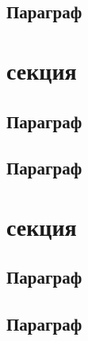 \documentclass[11pt,a4paper]{memoir}
\begin{document}
            \subsection{Параграф}

        \section{секция}
            \subsection{Параграф}
            \subsection{Параграф}

        \section{секция}
            \subsection{Параграф}
            \subsection{Параграф}
\end{document}
